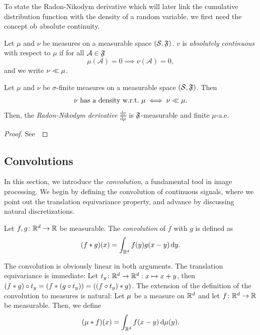 To state the Radon-Nikodym derivative which will later link the cumulative distribution function with the density of a random variable, we first need the concept ob absolute continuity.
\begin{definition}%
	\label{def:absolute continuity}
	Let \( \mu \) and \( \nu \) be measures on a measurable space \( (\mathcal{S}, \mathfrak{F}) \).
	\( v \) is \emph{absolutely continuous} with respect to \( \mu \) if for all \( \mathcal{A} \in \mathfrak{F} \)
	\begin{equation}
		\mu(\mathcal{A}) = \num{0} \implies \nu(\mathcal{A}) = \num{0},
	\end{equation}
	and we write \( \nu \ll \mu \).
\end{definition}
\begin{theorem}%
	\label{th:radon-nikodym}
	Let \( \mu \) and \( \nu \) be \( \sigma \)-finite measures on a measurable space \( (\mathcal{S}, \mathfrak{F}) \).
	Then
	\begin{equation}
		\nu\ \text{has a density w.r.t.}\ \mu \iff \nu \ll \mu.
	\end{equation}
	Then, the \emph{Radon-Nikodym derivative} \( \frac{\mathrm{d}\nu}{\mathrm{d}\mu} \) is \( \mathfrak{F} \)-measurable and finite \( \mu \)-a.e.
\end{theorem}
\begin{proof}
	See~\cite[theorem 7.34]{Klenke2014}
\end{proof}
\subsection{Convolutions}
\label{ssec:convolutions}
In this section, we introduce the \emph{convolution}, a fundamental tool in image processing.
We begin by defining the convolution of continuous signals, where we point out the translation equivariance property, and advance by discussing natural discretizations.
\begin{definition}[Convolution]%
	\label{def:convolution}
	Let \( f, g \colon \mathbb{R}^d \to \mathbb{R} \) be measurable.
	The \emph{convolution} of \( f \) with \( g \) is defined as
	\begin{equation}
		(f \ast g)(x) = \int_{\mathbb{R}^d} f(y) g(x - y)\,\mathrm{d} y.
	\end{equation}
\end{definition}
The convolution is obviously linear in both arguments.
The translation equivariance is immediate:
Let \( t_y \colon \mathbb{R}^d \to \mathbb{R}^d: x \mapsto x + y \), then \( (f \ast g) \circ t_y = (f \ast (g \circ t_y)) = ((f\circ t_y) \ast g) \).
The extension of the definition of the convolution to measures is natural:
Let \( \mu \) be a measure on \( \mathbb{R}^d \) and let \( f \colon \mathbb{R}^d \to \mathbb{R} \) be measurable.
Then, we define
\begin{equation}
	(\mu \ast f)(x) = \int_{\mathbb{R}^d} f(x - y)\,\mathrm{d}\mu(y).
\end{equation}

